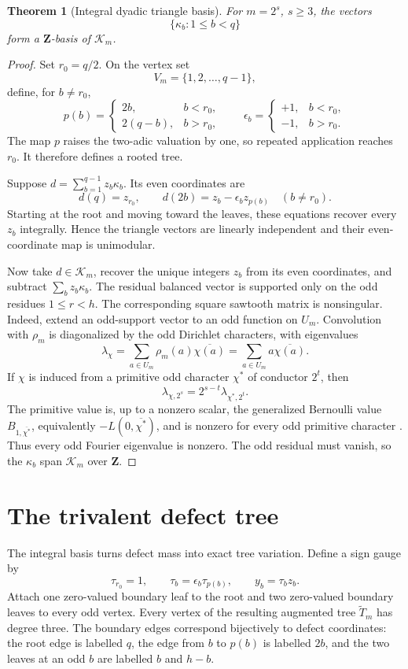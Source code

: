 \documentclass[11pt,oneside]{book}
\newtheorem{theorem}{Theorem}[chapter]
\theoremstyle{definition}
\theoremstyle{remark}
\begin{document}
\begin{theorem}[Integral dyadic triangle basis]
For \(m=2^s\), \(s\ge3\), the vectors
\[
\{\kappa_b:1\le b<q\}
\]
form a \(\mathbf Z\)-basis of \(\mathcal K_m\).
\end{theorem}
\begin{proof}
Set \(r_0=q/2\). On the vertex set
\[
V_m=\{1,2,\ldots,q-1\},
\]
define, for \(b\ne r_0\),
\[
p(b)=
\begin{cases}
2b,&b<r_0,\\
2(q-b),&b>r_0,
\end{cases}
\qquad
\epsilon_b=
\begin{cases}
+1,&b<r_0,\\
-1,&b>r_0.
\end{cases}
\]
The map \(p\) raises the two-adic valuation by one, so repeated application reaches \(r_0\). It therefore defines a rooted tree.

Suppose \(d=\sum_{b=1}^{q-1}z_b\kappa_b\). Its even coordinates are
\[
d(q)=z_{r_0},
\qquad
d(2b)=z_b-\epsilon_bz_{p(b)}
\quad(b\ne r_0).
\]
Starting at the root and moving toward the leaves, these equations recover every \(z_b\) integrally. Hence the triangle vectors are linearly independent and their even-coordinate map is unimodular.

Now take \(d\in\mathcal K_m\), recover the unique integers \(z_b\) from its even coordinates, and subtract \(\sum_bz_b\kappa_b\). The residual balanced vector is supported only on the odd residues \(1\le r<h\). The corresponding square sawtooth matrix is nonsingular. Indeed, extend an odd-support vector to an odd function on \(U_m\). Convolution with \(\rho_m\) is diagonalized by the odd Dirichlet characters, with eigenvalues
\[
\lambda_\chi=
\sum_{a\in U_m}\rho_m(a)\overline{\chi(a)}
=
\sum_{a\in U_m}a\overline{\chi(a)}.
\]
If \(\chi\) is induced from a primitive odd character \(\chi^*\) of conductor \(2^t\), then
\[
\lambda_{\chi,2^s}=2^{s-t}\lambda_{\chi^*,2^t}.
\]
The primitive value is, up to a nonzero scalar, the generalized Bernoulli value \(B_{1,\overline{\chi^*}}\), equivalently \(-L(0,\overline{\chi^*})\), and is nonzero for every odd primitive character \cite{WashingtonCyclotomic}. Thus every odd Fourier eigenvalue is nonzero. The odd residual must vanish, so the \(\kappa_b\) span \(\mathcal K_m\) over \(\mathbf Z\).
\end{proof}

\section{The trivalent defect tree}
The integral basis turns defect mass into exact tree variation. Define a sign gauge by
\[
\tau_{r_0}=1,
\qquad
\tau_b=\epsilon_b\tau_{p(b)},
\qquad
y_b=\tau_bz_b.
\]
Attach one zero-valued boundary leaf to the root and two zero-valued boundary leaves to every odd vertex. Every vertex of the resulting augmented tree \(\widetilde T_m\) has degree three. The boundary edges correspond bijectively to defect coordinates: the root edge is labelled \(q\), the edge from \(b\) to \(p(b)\) is labelled \(2b\), and the two leaves at an odd \(b\) are labelled \(b\) and \(h-b\).
\end{document}
